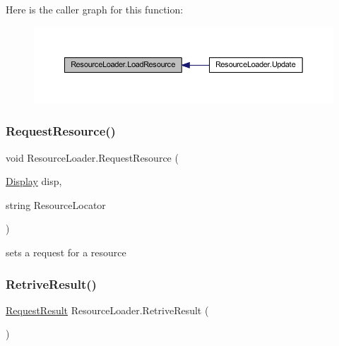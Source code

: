 Here is the caller graph for this function\+:
\nopagebreak
\begin{figure}[H]
\begin{center}
\leavevmode
\includegraphics[width=350pt]{class_resource_loader_a088ef33ee82be6e64028b6b5512fad5d_icgraph}
\end{center}
\end{figure}
\mbox{\label{class_resource_loader_af8914b966c0734e7f5fb3a81a9a968fa}} 
\subsubsection{\texorpdfstring{Request\+Resource()}{RequestResource()}}
{\footnotesize\ttfamily void Resource\+Loader.\+Request\+Resource (\begin{DoxyParamCaption}\item[{\mbox{\hyperlink{class_display}{Display}}}]{disp,  }\item[{string}]{Resource\+Locator }\end{DoxyParamCaption})}



sets a request for a resource 

\mbox{\label{class_resource_loader_ae0f219fead6e05415dc2523529d81561}} 
\subsubsection{\texorpdfstring{Retrive\+Result()}{RetriveResult()}}
{\footnotesize\ttfamily \mbox{\hyperlink{struct_resource_loader_1_1_request_result}{Request\+Result}} Resource\+Loader.\+Retrive\+Result (\begin{DoxyParamCaption}{ }\end{DoxyParamCaption})}



